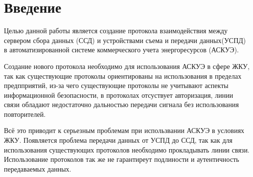 \newpage
\section{Введение}
\setcounter{figure}{0}


Целью данной работы является создание протокола взаимодействия между сервером сбора данных (ССД) и устройствами съема и передачи данных(УСПД) в автоматизированной системе коммерческого учета энергоресурсов (АСКУЭ).

Создание нового протокола необходимо для использования АСКУЭ в сфере ЖКУ, так как существующие протоколы ориентированы на использования в пределах предпприятий, из-за чего существующие протоколы не учитывают аспекты информационной безопасности, в протоколах отсуствует авторизация, линии связи обладают недостаточно дальностью передачи сигнала без использования повторителей. 

Всё это приводит к серьезным проблемам при использвании АСКУЭ в условиях ЖКУ. Появляется проблема передачи данных от УСПД до ССД, так как для использования существующих протоколов необходимо прокладывать линии связи. Использование протоколов так же не гарантиреут подлиности и аутентичность передаваемых данных. 

